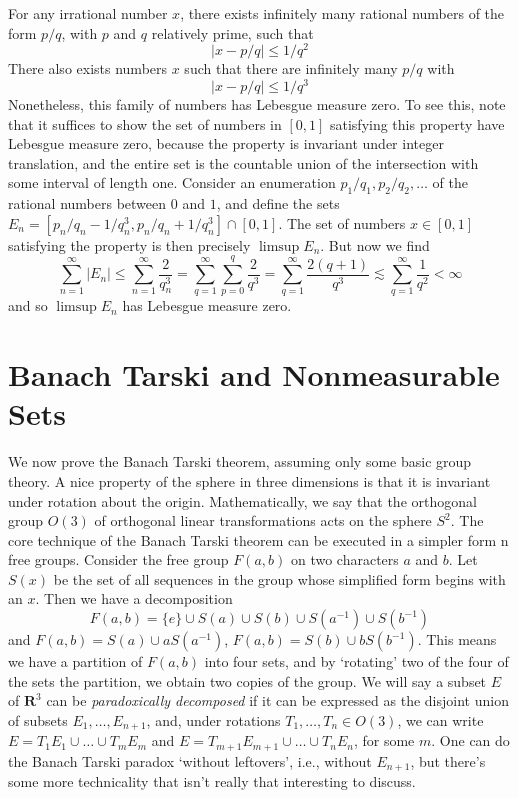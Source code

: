\begin{example}
  For any irrational number $x$, there exists infinitely many rational numbers of the form $p/q$, with $p$ and $q$ relatively prime, such that
  \[ |x - p/q| \leq 1/q^2 \]
  There also exists numbers $x$ such that there are infinitely many $p/q$ with
  \[ |x - p/q| \leq 1/q^3 \]
  Nonetheless, this family of numbers has Lebesgue measure zero. To see this, note that it suffices to show the set of numbers in $[0,1]$ satisfying this property have Lebesgue measure zero, because the property is invariant under integer translation, and the entire set is the countable union of the intersection with some interval of length one. Consider an enumeration $p_1/q_1, p_2/q_2, \dots$ of the rational numbers between $0$ and $1$, and define the sets $E_n = [p_n/q_n - 1/q_n^3, p_n/q_n + 1/q_n^3] \cap [0,1]$. The set of numbers $x \in [0,1]$ satisfying the property is then precisely $\limsup E_n$. But now we find
  \[ \sum_{n = 1}^\infty |E_n| \leq \sum_{n = 1}^\infty \frac{2}{q_n^3} = \sum_{q = 1}^\infty \sum_{p = 0}^q \frac{2}{q^3} = \sum_{q = 1}^\infty \frac{2(q+1)}{q^3} \lesssim \sum_{q = 1}^\infty \frac{1}{q^2} < \infty \]
  and so $\limsup E_n$ has Lebesgue measure zero.
\end{example}

\section{Banach Tarski and Nonmeasurable Sets}

We now prove the Banach Tarski theorem, assuming only some basic group theory. A nice property of the sphere in three dimensions is that it is invariant under rotation about the origin. Mathematically, we say that the orthogonal group $O(3)$ of orthogonal linear transformations acts on the sphere $S^2$. The core technique of the Banach Tarski theorem can be executed in a simpler form n free groups. Consider the free group $F(a,b)$ on two characters $a$ and $b$. Let $S(x)$ be the set of all sequences in the group whose simplified form begins with an $x$. Then we have a decomposition
%
\[ F(a,b) = \{ e \} \cup S(a) \cup S(b) \cup S(a^{-1}) \cup S(b^{-1}) \]
%
and $F(a,b) = S(a) \cup aS(a^{-1})$, $F(a,b) = S(b) \cup bS(b^{-1})$. This means we have a partition of $F(a,b)$ into four sets, and by `rotating' two of the four of the sets the partition, we obtain two copies of the group. We will say a subset $E$ of $\mathbf{R}^3$ can be {\it paradoxically decomposed} if it can be expressed as the disjoint union of subsets $E_1, \dots, E_{n+1}$, and, under rotations $T_1, \dots, T_n \in O(3)$, we can write $E = T_1E_1 \cup \dots \cup T_mE_m$ and $E = T_{m+1}E_{m+1} \cup \dots \cup T_nE_n$, for some $m$. One can do the Banach Tarski paradox `without leftovers', i.e., without $E_{n+1}$, but there's some more technicality that isn't really that interesting to discuss.

